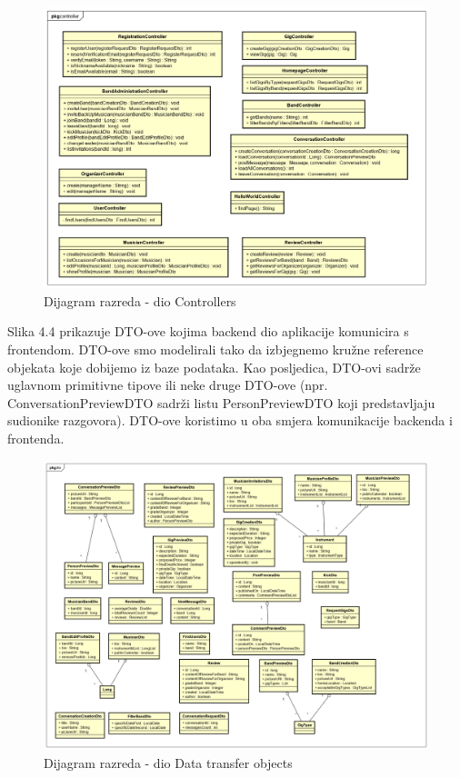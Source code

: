			\begin{figure}[H]
				\begin{center}
					\includegraphics[width=17cm]{slike/kontroleri.PNG}
				\end{center}
				\caption{Dijagram razreda - dio Controllers}
				\label{fig:kontroleri}
			\end{figure}
		
			Slika 4.4 prikazuje DTO-ove kojima backend dio aplikacije komunicira s frontendom. DTO-ove smo modelirali tako da izbjegnemo kružne reference objekata koje dobijemo iz baze podataka. Kao posljedica, DTO-ovi sadrže uglavnom primitivne tipove ili neke druge DTO-ove (npr. ConversationPreviewDTO sadrži listu PersonPreviewDTO koji predstavljaju sudionike razgovora). DTO-ove koristimo u oba smjera komunikacije backenda i frontenda.
			
			
			\begin{figure}[H]
				\begin{center}
					\includegraphics[width=17cm]{slike/DTO.PNG}
				\end{center}
				\caption{Dijagram razreda - dio Data transfer objects}
				\label{fig:dto}
			\end{figure}
		
